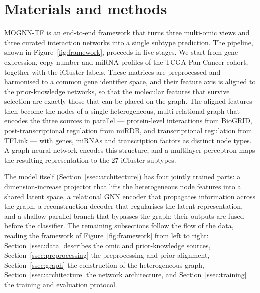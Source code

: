 \documentclass[review,3p,times,11pt, ]{elsarticle} %
\begin{document}

\section{Materials and methods}
\label{sec:methods}

MOGNN-TF is an end-to-end framework that turns three multi-omic views
and three curated interaction networks into a single subtype
prediction. The pipeline, shown in Figure~\ref{fig:framework}, proceeds
in five stages. We start from gene expression, copy number and miRNA
profiles of the TCGA Pan-Cancer cohort, together with the iCluster
labels. These matrices are preprocessed and harmonised to a common
gene identifier space, and their feature axis is aligned to the
prior-knowledge networks, so that the molecular features that survive
selection are exactly those that can be placed on the graph. The
aligned features then become the nodes of a single heterogeneous,
multi-relational graph that encodes the three sources in parallel —
protein-level interactions from BioGRID, post-transcriptional
regulation from miRDB, and transcriptional regulation from TFLink —
with genes, miRNAs and transcription factors as distinct node types. A
graph neural network encodes this structure, and a multilayer
perceptron maps the resulting representation to the 27 iCluster
subtypes.

The model itself (Section~\ref{ssec:architecture}) has four jointly
trained parts: a dimension-increase projector that lifts the
heterogeneous node features into a shared latent space, a relational
GNN encoder that propagates information across the graph, a
reconstruction decoder that regularises the latent representation, and
a shallow parallel branch that bypasses the graph; their outputs are
fused before the classifier. The remaining subsections follow the flow
of the data, reading the framework of Figure~\ref{fig:framework} from
left to right: Section~\ref{ssec:data} describes the omic and
prior-knowledge sources, Section~\ref{ssec:preprocessing} the
preprocessing and prior alignment, Section~\ref{ssec:graph} the
construction of the heterogeneous graph, Section~\ref{ssec:architecture}
the network architecture, and Section~\ref{ssec:training} the training
and evaluation protocol.
\end{document}
